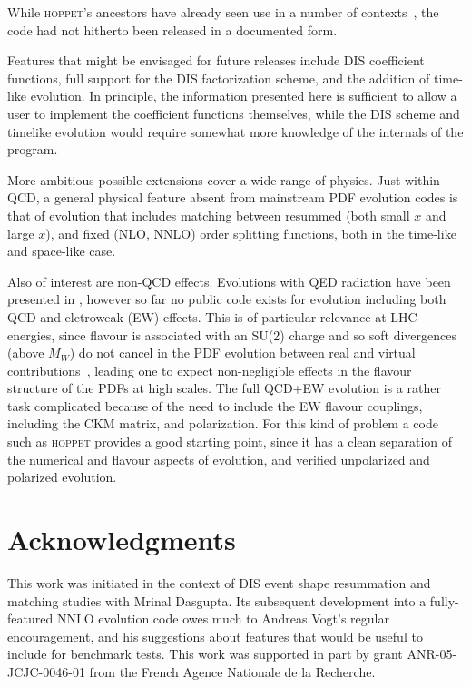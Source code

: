 \documentclass[12pt]{article}
\newcommand{\hoppet}{\textsc{hoppet}\xspace}
\begin{document}
While \hoppet's ancestors have already seen use in a number of
contexts~\cite{DisResum,Benchmarks,caesar,smallx,APPL}, the code had
not hitherto been released in a documented form.

Features that might be envisaged for future releases include DIS
coefficient functions, full support for the DIS factorization scheme,
and the addition of time-like evolution.  In principle, the
information presented here is sufficient to allow a user to implement
the coefficient functions themselves, while the DIS scheme and
timelike evolution would require somewhat more knowledge of the
internals of the program.

More ambitious possible extensions cover a wide range of physics.
Just within QCD, a general physical feature absent from mainstream PDF
evolution codes is that of evolution that includes matching between
resummed (both small $x$ and large $x$), and fixed (NLO, NNLO) order
splitting functions, both in the time-like and space-like case. 

Also of interest are non-QCD effects. Evolutions with QED radiation
have been presented in \cite{QED+QCD}, however so far no public code
exists for evolution including both QCD and eletroweak (EW) effects.
This is of particular relevance at LHC energies, since flavour is
associated with an SU(2) charge and so soft divergences (above $M_W$)
do not cancel in the PDF evolution between real and virtual
contributions~\cite{BNviol,EWDGLAP}, leading one to expect
non-negligible effects in the flavour structure of the PDFs at high
scales.
%
The full QCD+EW evolution is a rather task complicated because of the
need to include the EW flavour couplings, including the CKM matrix,
and polarization. For this kind of problem a code such as \hoppet
provides a good starting point, since it has a clean separation of the
numerical and flavour aspects of evolution, and verified unpolarized
and polarized evolution.


\section*{Acknowledgments}

This work was initiated in the context of DIS event shape resummation
and matching studies \cite{DisResum} with Mrinal Dasgupta. Its
subsequent development into a fully-featured NNLO evolution code owes
much to Andreas Vogt's regular encouragement, and his suggestions
about features that would be useful to include for benchmark tests.
%
This work was supported in part by grant ANR-05-JCJC-0046-01 from the
French Agence Nationale de la Recherche.
\end{document}
